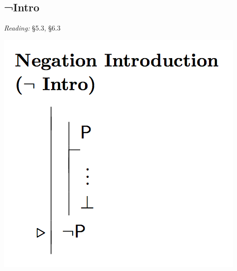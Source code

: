 \documentclass[12pt]{extarticle}
\begin{document}
\begin{multicols*}{3}
\begin{minipage}{\columnwidth}
\section{¬Intro}
 
\emph{Reading:} §5.3, §6.3
 
\begin{center}
\includegraphics[scale=0.3]{img/rule_negation_intro.png}
\end{center}
 \end{minipage}
 
 
\vfill



 

\end{multicols*}
\end{document}
